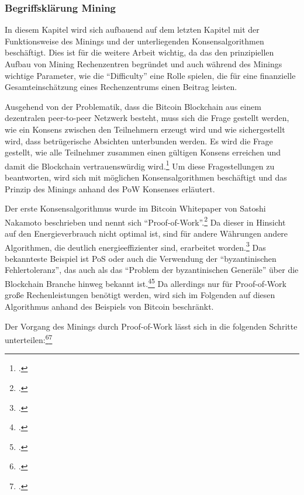\subsubsection{Begriffsklärung Mining} \label{toc:miningundkonsensalgorithmen}

In diesem Kapitel wird sich aufbauend auf dem letzten Kapitel mit der Funktionsweise des Minings und der unterliegenden
Konsensalgorithmen beschäftigt. Dies ist für die weitere Arbeit wichtig, da das den prinzipiellen Aufbau von Mining
Rechenzentren begründet und auch während des Minings wichtige Parameter, wie die "`Difficulty"' eine Rolle spielen, die
für eine finanzielle Gesamteinschätzung eines Rechenzentrums einen Beitrag leisten.

Ausgehend von der Problematik, dass die Bitcoin Blockchain aus einem dezentralen peer-to-peer Netzwerk besteht, muss
sich die Frage gestellt werden, wie ein Konsens zwischen den Teilnehmern erzeugt wird und wie sichergestellt wird,
dass betrügerische Absichten unterbunden werden. Es wird die Frage gestellt, wie alle Teilnehmer zusammen einen gültigen
Konsens erreichen und damit die Blockchain vertrauenswürdig wird.\footcite[Vgl.][Abb. 3]{derks2018chaining}
Um diese Fragestellungen zu beantworten, wird sich mit möglichen Konsensalgorithmen beschäftigt und das Prinzip
des Minings anhand des \ac{PoW} Konsenses erläutert.

Der erste Konsensalgorithmus wurde im Bitcoin Whitepaper von Satoshi Nakamoto beschrieben und nennt sich
"`Proof-of-Work"'.\footcite[Vgl.][S. 3]{nakamoto2008bitcoin} Da dieser in Hinsicht auf den Energieverbrauch nicht
optimal ist, sind für andere Währungen andere Algorithmen, die deutlich energieeffizienter sind, erarbeitet
worden.\footcite[Vgl.][]{dwcom2021bitcoin} Das bekannteste Beispiel ist \ac{PoS} oder auch die Verwendung der
"`byzantinischen Fehlertoleranz"', das auch als das "`Problem der byzantinischen Generäle"' über die Blockchain
Branche hinweg bekannt ist.\footcite[Vgl.][S. 2]{friedlmaier2018disrupting}\footcite[Vgl.][S. 746]{mukhopadhyay2016brief}
Da allerdings nur für Proof-of-Work große Rechenleistungen benötigt werden, wird sich im Folgenden auf diesen Algorithmus
anhand des Beispiels von Bitcoin beschränkt.

Der Vorgang des Minings durch Proof-of-Work lässt sich in die folgenden Schritte
unterteilen:\footcite[Vgl.][S. 3]{nakamoto2008bitcoin}\footcite[Vgl.][S. 51]{li2019blockchain}

